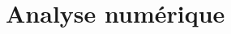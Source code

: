 \documentclass[a4paper]{article}
\begin{document}
\section{Analyse numérique}

\newpage

\medskip


	
\end{document}
